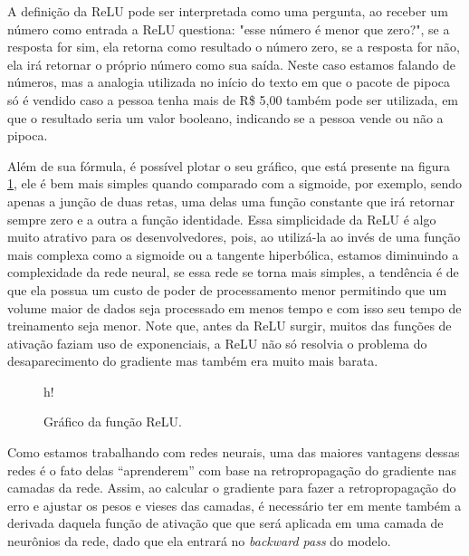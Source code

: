 A definição da ReLU pode ser interpretada como uma pergunta, ao receber um número como entrada a ReLU questiona: "esse número é menor que zero?", se a resposta for sim, ela retorna como resultado o número zero, se a resposta for não, ela irá retornar o próprio número como sua saída. Neste caso estamos falando de números, mas a analogia utilizada no início do texto em que o pacote de pipoca só é vendido caso a pessoa tenha mais de R\$ 5,00 também pode ser utilizada, em que o resultado seria um valor booleano, indicando se a pessoa vende ou não a pipoca.

Além de sua fórmula, é possível plotar o seu gráfico, que está presente na figura \ref{fig:relu}, ele é bem mais simples quando comparado com a sigmoide, por exemplo, sendo apenas a junção de duas retas, uma delas uma função constante que irá retornar sempre zero e a outra a função identidade. Essa simplicidade da ReLU é algo muito atrativo para os desenvolvedores, pois, ao utilizá-la ao invés de uma função mais complexa como a sigmoide ou a tangente hiperbólica, estamos diminuindo a complexidade da rede neural, se essa rede se torna mais simples, a tendência é de que ela possua um custo de poder de processamento menor permitindo que um volume maior de dados seja processado em menos tempo e com isso seu tempo de treinamento seja menor. Note que, antes da ReLU surgir, muitos das funções de ativação faziam uso de exponenciais, a ReLU não só resolvia o problema do desaparecimento do gradiente mas também era muito mais barata.

\begin{figure}{h!}
    \centering
    \caption{Gráfico da função ReLU.}
    \label{fig:relu}
\end{figure}

Como estamos trabalhando com redes neurais, uma das maiores vantagens dessas redes é o fato delas “aprenderem” com base na retropropagação do gradiente nas camadas da rede. Assim, ao calcular o gradiente para fazer a retropropagação do erro e ajustar os pesos e vieses das camadas, é necessário ter em mente também a derivada daquela função de ativação que que será aplicada em uma camada de neurônios da rede, dado que ela entrará no \textit{backward pass} do modelo.

